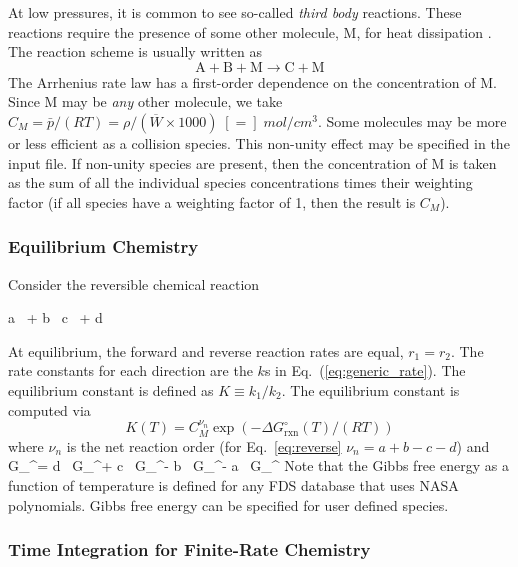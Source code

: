 At low pressures, it is common to see so-called \emph{third body} reactions.  These reactions require the presence of some other molecule, M, for heat dissipation \cite{Turns:1996}.  The reaction scheme is usually written as
\begin{equation}\label{eq:third_body}
\mathrm{A} + \mathrm{B} + \mathrm{M} \rightarrow \mathrm{C} + \mathrm{M}
\end{equation}
The Arrhenius rate law has a first-order dependence on the concentration of M.  Since M may be \emph{any} other molecule, we take $C_{\unit{M}} = \bar{p}/(R T) = \rho/(\overline{W} \times 1000) \;[=]\;\unit{mol/cm^3}$. Some molecules may be more or less efficient as a collision species. This non-unity effect may be specified in the input file. If non-unity species are present, then the concentration of M is taken as the sum of all the individual species concentrations times their weighting factor (if all species have a weighting factor of 1, then the result is $C_{\unit{M}}$).

\subsubsection{Equilibrium Chemistry}
\label{sec:equilChem}

Consider the reversible chemical reaction

\be
a \,  + b \,   c \,  + d \, 
\label{eq:reverse}
\ee

\noindent At equilibrium, the forward and reverse reaction rates are equal, $r_{1} = r_{2}$.  The rate constants for each direction are the $k$s in Eq.~(\ref{eq:generic_rate}).  The equilibrium constant is defined as $K \equiv k_{1}/k_{2}$.  The equilibrium constant is computed via
\begin{equation}\label{eq:equilibrium_const}
K(T) = C_{\unit{M}}^{\nu_n} \exp(-\Delta G_{\mathrm{rxn}}^\circ(T)/(RT))
\end{equation}
where $\nu_n$ is the net reaction order (for Eq.~\ref{eq:reverse} $\nu_n = a + b - c - d$) and
\be                                                               
G_{}^\circ = d \, G_^\circ + c \, G_^\circ - b \, G_^\circ - a \, G_^\circ
\ee
Note that the Gibbs free energy as a function of temperature is defined for any FDS database that uses NASA polynomials.  Gibbs free energy can be specified for user defined species.

\subsubsection{Time Integration for Finite-Rate Chemistry}

